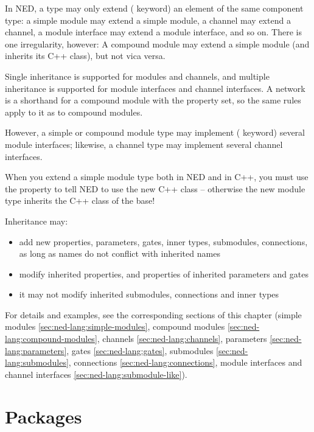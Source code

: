 In NED, a type may only extend ( keyword) an element of
the same component type: a simple module may extend a simple module, a
channel may extend a channel, a module interface may extend a module
interface, and so on. There is one irregularity, however: A compound module
may extend a simple module (and inherits its C++ class), but not vica
versa.

Single inheritance is supported for modules and channels, and multiple inheritance
is supported for module interfaces and channel interfaces. A network is a
shorthand for a compound module with the  property set, so
the same rules apply to it as to compound modules.

However, a simple or compound module type may implement (
keyword) several module interfaces; likewise, a channel type may implement
several channel interfaces.

\begin{important}
    When you extend a simple module type both in NED and in C++, you must
    use the  property to tell NED to use the new C++ class --
    otherwise the new module type inherits the C++ class of the base!
\end{important}

Inheritance may:
\begin{itemize}
    \item add new properties, parameters, gates, inner types, submodules,
          connections, as long as names do not conflict with inherited names
    \item modify inherited properties, and properties of inherited parameters and
          gates
    \item it may not modify inherited submodules, connections and inner types
\end{itemize}

For details and examples, see the corresponding sections of this chapter
(simple modules \ref{sec:ned-lang:simple-modules},
compound modules \ref{sec:ned-lang:compound-modules},
channels \ref{sec:ned-lang:channels},
parameters \ref{sec:ned-lang:parameters},
gates \ref{sec:ned-lang:gates},
submodules \ref{sec:ned-lang:submodules},
connections \ref{sec:ned-lang:connections},
module interfaces and channel interfaces \ref{sec:ned-lang:submodule-like}).



\section{Packages}
\label{sec:ned-lang:packages}

